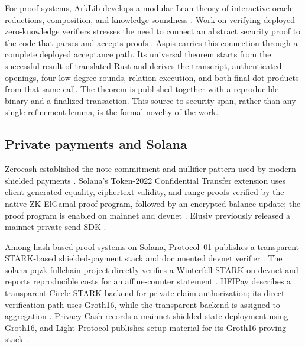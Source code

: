 For proof systems, ArkLib develops a modular Lean theory of interactive oracle
reductions, composition, and knowledge soundness \cite{ArkLib2026}.  Work on
verifying deployed zero-knowledge verifiers stresses the need to connect an
abstract security proof to the code that parses and accepts proofs
\cite{FirsovLivshits2024}.  Aspis carries this connection through a complete
deployed acceptance path.  Its universal theorem starts from the successful
result of translated Rust and derives the transcript, authenticated openings,
four low-degree rounds, relation execution, and both final dot products from
that same call.  The theorem is published together with a reproducible binary
and a finalized transaction.  This source-to-security span, rather than any
single refinement lemma, is the formal novelty of the work.

\subsection{Private payments and Solana}

Zerocash established the note-commitment and nullifier pattern used by modern
shielded payments \cite{BenSassonEtAl2014Zerocash}.  Solana's Token-2022
Confidential Transfer extension uses client-generated equality,
ciphertext-validity, and range proofs verified by the native ZK ElGamal proof
program, followed by an encrypted-balance update; the proof program is enabled
on mainnet and devnet \cite{SolanaConfidentialTransfer2026}.  Elusiv previously
released a mainnet private-send SDK \cite{ElusivSDK2023}.

Among hash-based proof systems on Solana, Protocol~01
publishes a transparent STARK-based shielded-payment stack and documented
devnet verifier \cite{Protocol01Repository2026}.  The solana-pqzk-fullchain
project directly verifies a Winterfell STARK on devnet and reports
reproducible costs for an affine-counter statement
\cite{Yano2026SolanaPQZK}.  HFIPay describes a transparent Circle STARK
backend for private claim authorization; its direct verification path uses
Groth16, while the transparent backend is assigned to aggregation
\cite{Wang2026HFIPay}.  Privacy Cash records a mainnet shielded-state
deployment using Groth16, and Light Protocol publishes setup material for its
Groth16 proving stack
\cite{PrivacyCashSetup2026,PrivacyCashMainnet2026,
LightProtocolSetup2026}.

